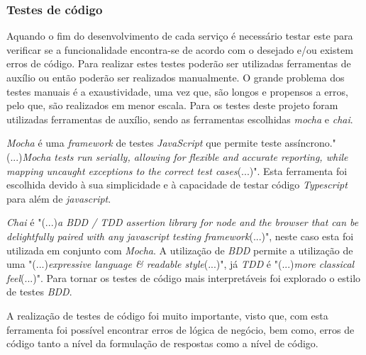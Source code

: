 \subsubsection{Testes de código}
Aquando o fim do desenvolvimento de cada serviço é necessário testar este para verificar se a funcionalidade encontra-se de acordo com o desejado e/ou existem erros de código. Para realizar estes testes poderão ser utilizadas ferramentas de auxílio ou então poderão ser realizados manualmente. O grande problema dos testes manuais é a exaustividade, uma vez que, são longos e propensos a erros, pelo que, são realizados em menor escala. Para os testes deste projeto foram utilizadas ferramentas de auxílio, sendo as ferramentas escolhidas \textit{mocha} e \textit{chai}.

\textit{Mocha} é uma \textit{framework} de testes \textit{JavaScript} que permite teste assíncrono."(...)\emph{Mocha tests run serially, allowing for flexible and accurate reporting, while mapping uncaught exceptions to the correct test cases}(...)"\citep{mocha}. Esta ferramenta foi escolhida devido à sua simplicidade e à capacidade de testar código \textit{Typescript} para além de \textit{javascript}.

\textit{Chai} é "(...)\emph{a BDD / TDD assertion library for node and the browser that can be delightfully paired with any javascript testing framework}(...)"\citep{chai}, neste caso esta foi utilizada em conjunto com \emph{Mocha}. A utilização de \emph{BDD} permite a utilização de uma "(...)\emph{expressive language \& readable style}(...)"\citep{chai}, já \emph{TDD} é "(...)\emph{more classical feel}(...)"\citep{chai}. Para tornar os testes de código mais interpretáveis foi explorado o estilo de testes \emph{BDD}.

A realização de testes de código foi muito importante, visto que, com esta ferramenta foi possível encontrar erros de lógica de negócio, bem como, erros de código tanto a nível da formulação de respostas como a nível de código.



